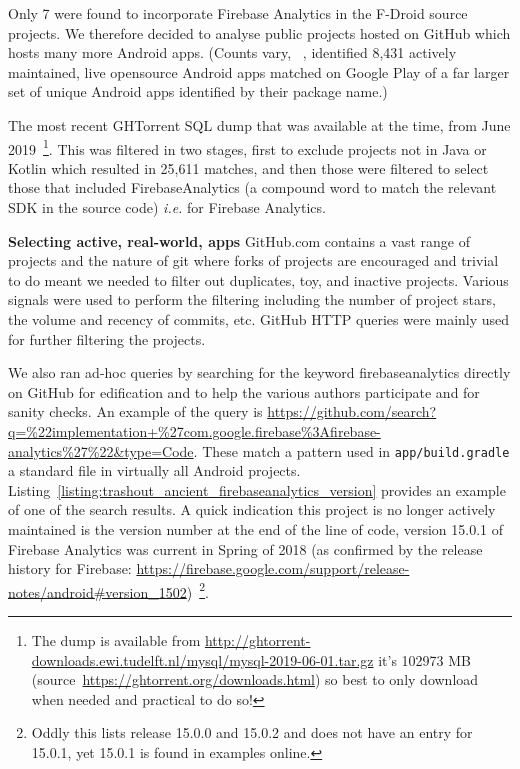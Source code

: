 Only 7 were found to incorporate Firebase Analytics in the F-Droid source projects. We therefore decided to analyse public projects hosted on GitHub which hosts many more Android apps. (Counts vary, ~\citep{geiger2018_a_graph_based_dataset_of_commit_history_of_realworld_android_apps}, identified 8,431 actively maintained, live opensource Android apps matched on Google Play of a far larger set of unique Android apps identified by their package name.)

The most recent GHTorrent SQL dump that was available at the time, from  June 2019~\footnote{The dump is available from \url{http://ghtorrent-downloads.ewi.tudelft.nl/mysql/mysql-2019-06-01.tar.gz} it's 102973 MB (source~\url{https://ghtorrent.org/downloads.html}) so best to only download when needed and practical to do so!}. This was filtered in two stages, first to exclude projects not in Java or Kotlin which resulted in 25,611 matches, and then those were filtered to select those that included FirebaseAnalytics (a compound word to match the relevant SDK in the source code) \textit{i.e.} for Firebase Analytics.

\textbf{Selecting active, real-world, apps}
GitHub.com contains a vast range of projects and the nature of git where forks of projects are encouraged and trivial to do meant we needed to filter out duplicates, toy, and inactive projects. Various signals were used to perform the filtering including the number of project stars, the volume and recency of commits, etc. GitHub HTTP queries were mainly used for further filtering the projects.

We also ran ad-hoc queries by searching for the keyword firebaseanalytics directly on GitHub for edification and to help the various authors participate and for sanity checks.
%
An example of the query is \url{https://github.com/search?q=\%22implementation+\%27com.google.firebase\%3Afirebase-analytics\%27\%22&type=Code}. These match a pattern used in \texttt{app/build.gradle} a standard file in virtually all Android projects. Listing~\ref{listing:trashout_ancient_firebaseanalytics_version} provides an example of one of the search results. A quick indication this project is no longer actively maintained is the version number at the end of the line of code, version 15.0.1 of Firebase Analytics was current in Spring of 2018 (as confirmed by the release history for Firebase: \url{https://firebase.google.com/support/release-notes/android#version_1502})~\footnote{Oddly this lists release 15.0.0 and 15.0.2 and does not have an entry for 15.0.1, yet 15.0.1 is found in examples online.}.

